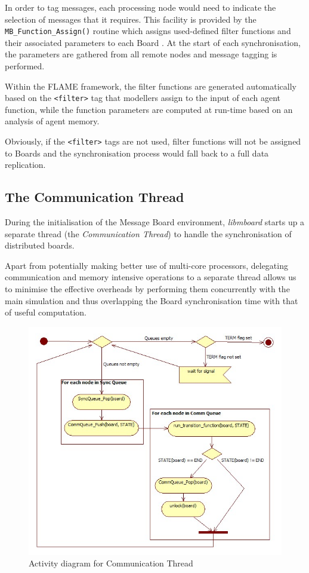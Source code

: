 In order to tag messages, each processing node would need to indicate the selection of messages that it requires. This facility is provided by the  \texttt{MB\_Function\_Assign()} routine which assigns used-defined filter functions and their associated parameters to each Board . At the start of each synchronisation, the parameters are gathered from all remote nodes and message tagging is performed.

Within the FLAME framework, the filter functions are generated automatically based on the \texttt{<filter>} tag that modellers assign to the input of each agent function, while the function parameters are computed at run-time based on an analysis of agent memory. 

Obviously, if the \texttt{<filter>} tags are not used, filter functions will not be assigned to Boards and the synchronisation process would fall back to a full data replication.

\subsection{The Communication Thread}
\label{sec:commthread}

During the initialisation of the Message Board environment, \textit{libmboard} starts up a separate thread (the \textit{Communication Thread}) to handle the synchronisation of distributed boards. 

Apart from potentially making better use of multi-core processors, delegating communication and memory intensive operations to a separate thread allows us to minimise the effective overheads by performing them concurrently with the main simulation and thus overlapping the Board synchronisation time with that of useful computation.

\begin{figure}[ht]
 \centering
  \includegraphics[scale=0.60]{commloop.jpg}
 \caption{Activity diagram for Communication Thread}
 \label{fig:commloop}
\end{figure}

